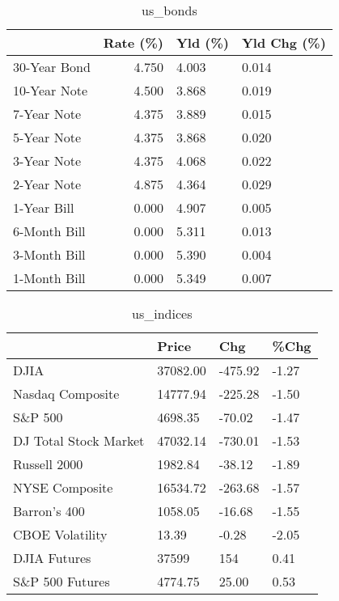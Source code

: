 \documentclass{article}%
\begin{document}
%


\begin{table}[htbp]%
\caption{us\_bonds}%
\centering%
\begin{adjustbox}{width=1\textwidth}%
\begin{tabular}{lrll}
\toprule
             &  Rate (\%) & Yld (\%) & Yld Chg (\%) \\
\midrule
30-Year Bond &     4.750 &   4.003 &       0.014 \\
10-Year Note &     4.500 &   3.868 &       0.019 \\
 7-Year Note &     4.375 &   3.889 &       0.015 \\
 5-Year Note &     4.375 &   3.868 &       0.020 \\
 3-Year Note &     4.375 &   4.068 &       0.022 \\
 2-Year Note &     4.875 &   4.364 &       0.029 \\
 1-Year Bill &     0.000 &   4.907 &       0.005 \\
6-Month Bill &     0.000 &   5.311 &       0.013 \\
3-Month Bill &     0.000 &   5.390 &       0.004 \\
1-Month Bill &     0.000 &   5.349 &       0.007 \\
\bottomrule
\end{tabular}
%
\end{adjustbox}%
\end{table}

%


\begin{table}[htbp]%
\caption{us\_indices}%
\centering%
\begin{adjustbox}{width=1\textwidth}%
\begin{tabular}{llll}
\toprule
                      &    Price &     Chg &  \%Chg \\
\midrule
                 DJIA & 37082.00 & -475.92 & -1.27 \\
     Nasdaq Composite & 14777.94 & -225.28 & -1.50 \\
              S\&P 500 &  4698.35 &  -70.02 & -1.47 \\
DJ Total Stock Market & 47032.14 & -730.01 & -1.53 \\
         Russell 2000 &  1982.84 &  -38.12 & -1.89 \\
       NYSE Composite & 16534.72 & -263.68 & -1.57 \\
         Barron's 400 &  1058.05 &  -16.68 & -1.55 \\
      CBOE Volatility &    13.39 &   -0.28 & -2.05 \\
         DJIA Futures &    37599 &     154 &  0.41 \\
      S\&P 500 Futures &  4774.75 &   25.00 &  0.53 \\
\bottomrule
\end{tabular}
%
\end{adjustbox}%
\end{table}
\end{document}
